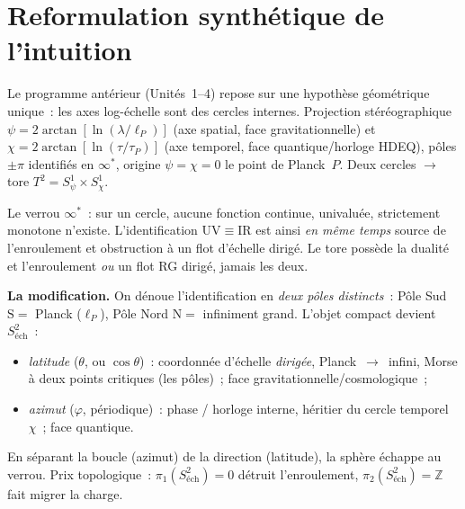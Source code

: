 \documentclass[11pt]{article}
\newcommand{\preuve}{{\small\textbf{[preuve]}}}
\newcommand{\num}{{\small\textbf{[num\'erique]}}}
\newcommand{\conj}{{\small\textbf{[conjecture]}}}
\newcommand{\heur}{{\small\textbf{[heuristique]}}}
\newcommand{\spec}{{\small\textbf{[sp\'eculation]}}}
\newcommand{\ouv}{{\small\textbf{[ouvert]}}}
\newcommand{\Spole}{\mathrm{S}}
\newcommand{\Npole}{\mathrm{N}}
\newcommand{\lP}{\ell_P}
\newcommand{\Stwo}{S^2_{\text{\'ech}}}
\theoremstyle{definition}
\begin{document}
\begin{abstract}
\smallskip
\noindent Ce n'est donc ni une unification, ni une promesse d'observation. C'est une \emph{architecture}
--- coh\'erente, sur-d\'etermin\'ee, et enti\`erement issue d'elle-m\^eme --- propos\'ee comme une
fa\c{c}on de penser ensemble l'\'echelle, la gravitation et le temps quantique. Chaque \'enonc\'e du texte
porte son statut.

\smallskip
\noindent\textbf{Statuts}~: \preuve\ exact~; \num\ reproductible~; \conj\ argument\'e~;
\heur\ analogie~; \spec\ sp\'eculatif~; \ouv\ \`a \'etablir. \emph{Aucune conjecture n'est pr\'esent\'ee
comme un th\'eor\`eme.}
\end{abstract}

\section{Reformulation synth\'etique de l'intuition}
Le programme ant\'erieur (Unit\'es~1--4) repose sur une hypoth\`ese g\'eom\'etrique unique~: les axes
log-\'echelle sont des cercles internes. Projection st\'er\'eographique
$\psi=2\arctan[\ln(\lambda/\lP)]$ (axe spatial, face gravitationnelle) et
$\chi=2\arctan[\ln(\tau/\tau_P)]$ (axe temporel, face quantique/horloge HDEQ), p\^oles $\pm\pi$
identifi\'es en $\infty^\ast$, origine $\psi=\chi=0$ le point de Planck~$P$. Deux cercles $\to$ tore
$T^2=S^1_\psi\times S^1_\chi$.

Le verrou $\infty^\ast$~: sur un cercle, aucune fonction continue, univalu\'ee, strictement monotone
n'existe. L'identification UV$\equiv$IR est ainsi \emph{en m\^eme temps} source de l'enroulement et
obstruction \`a un flot d'\'echelle dirig\'e. Le tore poss\`ede la dualit\'e et l'enroulement \emph{ou} un
flot RG dirig\'e, jamais les deux.

\textbf{La modification.} On d\'enoue l'identification en \emph{deux p\^oles distincts}~: P\^ole Sud
$\Spole=$ Planck ($\lP$), P\^ole Nord $\Npole=$ infiniment grand. L'objet compact devient $\Stwo$~:
\begin{itemize}[nosep]
\item \emph{latitude} ($\theta$, ou $\cos\theta$)~: coordonn\'ee d'\'echelle \emph{dirig\'ee},
Planck~$\to$~infini, Morse \`a deux points critiques (les p\^oles)~; face gravitationnelle/cosmologique~;
\item \emph{azimut} ($\varphi$, p\'eriodique)~: phase / horloge interne, h\'eritier du cercle temporel
$\chi$~; face quantique.
\end{itemize}
En s\'eparant la boucle (azimut) de la direction (latitude), la sph\`ere \'echappe au verrou. Prix
topologique~: $\pi_1(\Stwo)=0$ d\'etruit l'enroulement, $\pi_2(\Stwo)=\mathbb{Z}$ fait migrer la charge.
\end{document}
